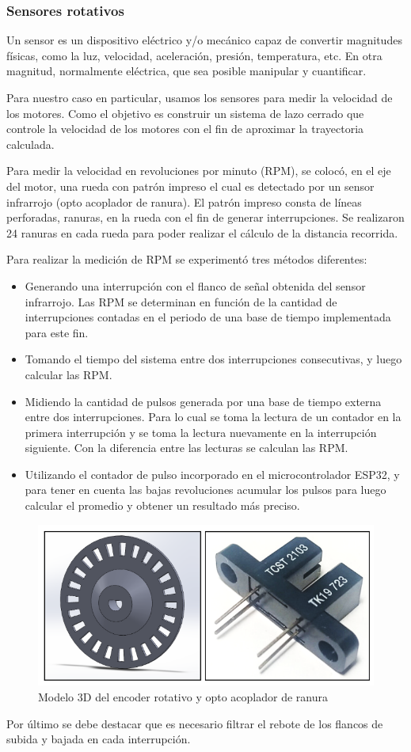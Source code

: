 \subsubsection{Sensores rotativos}

Un sensor es un dispositivo eléctrico y/o mecánico capaz de convertir magnitudes físicas, como la luz, velocidad, aceleración, presión, temperatura, etc. En otra magnitud, normalmente eléctrica, que sea posible manipular y cuantificar.

Para nuestro caso en particular, usamos los sensores para medir la velocidad de los motores. Como el objetivo es construir un sistema de lazo cerrado que controle la velocidad de los motores con el fin de aproximar la trayectoria calculada.

Para medir la velocidad en revoluciones por minuto (RPM), se colocó, en el eje del motor, una rueda con patrón impreso el cual es detectado por un sensor infrarrojo (opto acoplador de ranura). El patrón impreso consta de líneas perforadas, ranuras, en la rueda con el fin de generar interrupciones. Se realizaron 24 ranuras en cada rueda para poder realizar el cálculo de la distancia recorrida.

Para realizar la medición de RPM se experimentó tres métodos diferentes:

\begin{itemize}
   \item Generando una interrupción con el flanco de señal obtenida del sensor infrarrojo. Las RPM se determinan en función de la cantidad de interrupciones contadas en el periodo de una base de tiempo implementada para este fin.
   \item Tomando el tiempo del sistema entre dos interrupciones consecutivas, y luego calcular las RPM.
   \item Midiendo la cantidad de pulsos generada por una base de tiempo externa entre dos interrupciones. Para lo cual se toma la lectura de un contador en la primera interrupción y se toma la lectura nuevamente en la interrupción siguiente. Con la diferencia entre las lecturas se calculan las RPM.
   \item Utilizando el contador de pulso incorporado en el microcontrolador ESP32, y para tener en cuenta las bajas revoluciones acumular los pulsos para luego calcular el promedio y obtener un resultado más preciso.
\end{itemize}

\begin{figure}[H]
  \centering
  \includegraphics[width=0.5\linewidth]{images/encoder.png}
  \caption{Modelo 3D del encoder rotativo y opto acoplador de ranura}
  \label{fig:encoder}
\end{figure}

Por último se debe destacar que es necesario filtrar el rebote de los flancos de subida y bajada en cada interrupción.